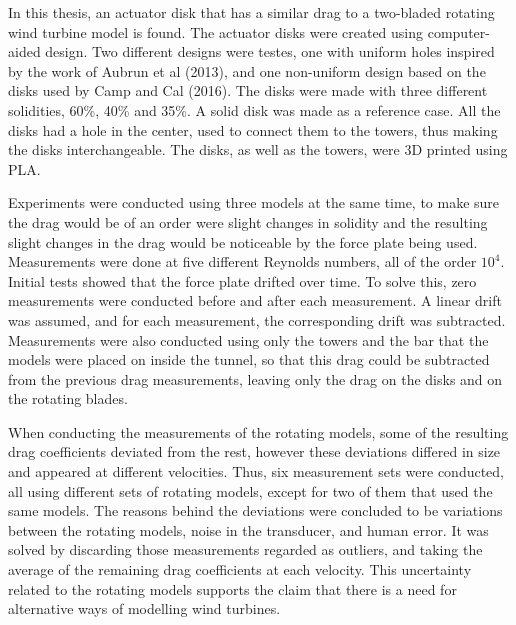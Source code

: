 

In this thesis, an actuator disk that has a similar drag to a two-bladed rotating wind turbine model is found. The actuator disks were created using computer-aided design. Two different designs were testes, one with uniform holes inspired by the work of Aubrun et al (2013)\cite{Aubrun2013}, and one non-uniform design based on the disks used by Camp and Cal (2016)\cite{Camp2016}. The disks were made with three different solidities, 60\%, 40\% and 35\%. A solid disk was made as a reference case. All the disks had a hole in the center, used to connect them to the towers, thus making the disks interchangeable. The disks, as well as the towers, were 3D printed using PLA. 

Experiments were conducted using three models at the same time, to make sure the drag would be of an order were slight changes in solidity and the resulting slight changes in the drag would be noticeable by the force plate being used. Measurements were done at five different Reynolds numbers, all of the order $10^4$. Initial tests showed that the force plate drifted over time. To solve this, zero measurements were conducted before and after each measurement. A linear drift was assumed, and for each measurement, the corresponding drift was subtracted. Measurements were also conducted using only the towers and the bar that the models were placed on inside the tunnel, so that this drag could be subtracted from the previous drag measurements, leaving only the drag on the disks and on the rotating blades.  

When conducting the measurements of the rotating models, some of the resulting drag coefficients deviated from the rest, however these deviations differed in size and appeared at different velocities. Thus, six measurement sets were conducted, all using different sets of rotating models, except for two of them that used the same models. The reasons behind the deviations were concluded to be variations between the rotating models, noise in the transducer, and human error. It was solved by discarding those measurements regarded as outliers, and taking the average of the remaining drag coefficients at each velocity. This uncertainty related to the rotating models supports the claim that there is a need for alternative ways of modelling wind turbines. 

